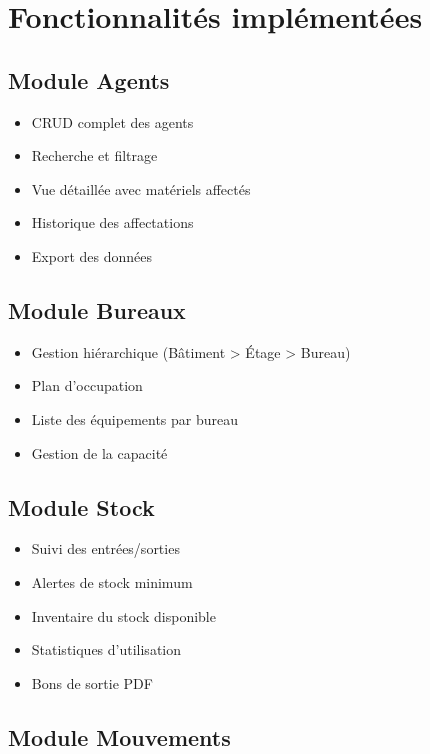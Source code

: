 \section{Fonctionnalités implémentées}

\subsection{Module Agents}

\begin{itemize}
    \item CRUD complet des agents
    \item Recherche et filtrage
    \item Vue détaillée avec matériels affectés
    \item Historique des affectations
    \item Export des données
\end{itemize}

\subsection{Module Bureaux}

\begin{itemize}
    \item Gestion hiérarchique (Bâtiment > Étage > Bureau)
    \item Plan d'occupation
    \item Liste des équipements par bureau
    \item Gestion de la capacité
\end{itemize}

\subsection{Module Stock}

\begin{itemize}
    \item Suivi des entrées/sorties
    \item Alertes de stock minimum
    \item Inventaire du stock disponible
    \item Statistiques d'utilisation
    \item Bons de sortie PDF
\end{itemize}

\subsection{Module Mouvements}

